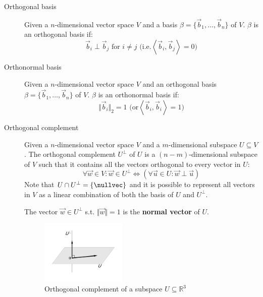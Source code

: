\begin{description}
    \item[Orthogonal basis] 
        Given a $n$-dimensional vector space $V$ and a basis $\beta = \{ \vec{b}_1, \dots, \vec{b}_n \}$ of $V$.
        $\beta$ is an orthogonal basis if:
        \[ \vec{b}_i \perp \vec{b}_j \text{ for } i \neq j \text{ (i.e.} \left\langle \vec{b}_i, \vec{b}_j \right\rangle = 0 \text{)} \]

    \item[Orthonormal basis] 
        Given a $n$-dimensional vector space $V$ and an orthogonal basis $\beta = \{ \vec{b}_1, \dots, \vec{b}_n \}$ of $V$.
        $\beta$ is an orthonormal basis if:
        \[ \Vert \vec{b}_i \Vert_2 = 1 \text{ (or} \left\langle \vec{b}_i, \vec{b}_i \right\rangle = 1 \text{)} \]
    
    \item[Orthogonal complement] 
        Given a $n$-dimensional vector space $V$ and a $m$-dimensional subspace $U \subseteq V$.
        The orthogonal complement $U^\perp$ of $U$ is a $(n-m)$-dimensional subspace of $V$ such that it
        contains all the vectors orthogonal to every vector in $U$:
        \[ \forall \vec{w} \in V: \vec{w} \in U^\perp \iff (\forall \vec{u} \in U: \vec{w} \perp \vec{u}) \]
        Note that $U \cap U^\perp = \{ \nullvec \}$ and 
        it is possible to represent all vectors in $V$ as a linear combination of both the basis of $U$ and $U^\perp$.
        
        The vector $\vec{w} \in U^\perp$ s.t. $\Vert \vec{w} \Vert = 1$ is the \textbf{normal vector} of $U$. 
        \begin{figure}[H]
            \centering
            \includegraphics[width=0.4\textwidth]{img/_orthogonal_complement.pdf}
            \caption{Orthogonal complement of a subspace $U \subseteq \mathbb{R}^3$}
        \end{figure}
\end{description}



